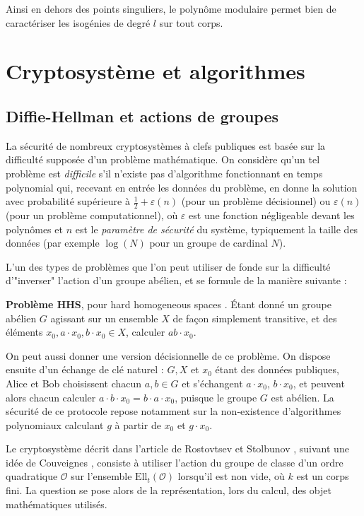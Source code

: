 \documentclass[11pt,a4paper]{article}
\renewcommand{\O}{\mathcal{O}}
\newcommand{\Ell}{\mathrm{Ell}}
\theoremstyle{definition}
\begin{document}
Ainsi en dehors des points singuliers, le polynôme modulaire permet bien de caractériser les isogénies de degré $l$ sur tout corps.

\newpage

\section{Cryptosystème et algorithmes}



\subsection{Diffie-Hellman et actions de groupes}


La sécurité de nombreux cryptosystèmes à clefs publiques est basée sur la difficulté supposée d'un problème mathématique. On considère qu'un tel problème est \emph{difficile} s'il n'existe pas d'algorithme fonctionnant en temps polynomial qui, recevant en entrée les données du problème, en donne la solution avec probabilité supérieure à $\frac{1}{2}+\varepsilon(n)$ (pour un problème décisionnel) ou $\varepsilon(n)$ (pour un problème computationnel), où $\varepsilon$ est une fonction négligeable devant les polynômes et $n$ est le \emph{paramètre de sécurité} du système, typiquement la taille des données (par exemple $\log(N)$ pour un groupe de cardinal $N$).

L'un des types de problèmes que l'on peut utiliser de fonde sur la difficulté d'"inverser" l'action d'un groupe abélien, et se formule de la manière suivante :

\textbf{Problème HHS}, pour \og hard homogeneous spaces \fg. \'Etant donné un groupe abélien $G$ agissant sur un ensemble $X$ de façon simplement transitive, et des éléments $x_0, a\cdot x_0, b\cdot x_0\in X$, calculer $ab\cdot x_0$.

On peut aussi donner une version décisionnelle de ce problème. On dispose ensuite d'un échange de clé naturel : $G, X$ et $x_0$ étant des données publiques, Alice et Bob choisissent chacun $a,b\in G$ et s'échangent $a\cdot x_0$, $b\cdot x_0$, et peuvent alors chacun calculer $a\cdot b\cdot x_0=b\cdot a\cdot x_0$, puisque le groupe $G$ est abélien. La sécurité de ce protocole repose notamment sur la non-existence d'algorithmes polynomiaux calculant $g$ à partir de $x_0$ et $g\cdot x_0$.

Le cryptosystème décrit dans l'article de Rostovtsev et Stolbunov \cite{RoSt}, suivant une idée de Couveignes \cite{Couv}, consiste à utiliser l'action du groupe de classe d'un ordre quadratique $\O$ sur l'ensemble $\Ell_t(\O)$ lorsqu'il est non vide, où $k$ est un corps fini. La question se pose alors de la représentation, lors du calcul, des objet mathématiques utilisés.
\end{document}
